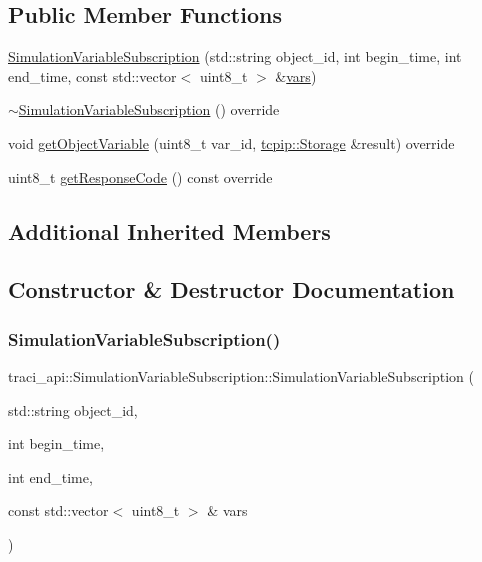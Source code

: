 \subsection*{Public Member Functions}
\begin{DoxyCompactItemize}
\item 
\hyperlink{classtraci__api_1_1_simulation_variable_subscription_a951c6d8797603b6bb73e6e78c226cf07}{Simulation\+Variable\+Subscription} (std\+::string object\+\_\+id, int begin\+\_\+time, int end\+\_\+time, const std\+::vector$<$ uint8\+\_\+t $>$ \&\hyperlink{classtraci__api_1_1_variable_subscription_a59bec6554debe2d14d75c29017561959}{vars})
\item 
\hyperlink{classtraci__api_1_1_simulation_variable_subscription_a25629e076fde526a24425f79da6523da}{$\sim$\+Simulation\+Variable\+Subscription} () override
\item 
void \hyperlink{classtraci__api_1_1_simulation_variable_subscription_aaa64f6368289ff45730d718e3f38f762}{get\+Object\+Variable} (uint8\+\_\+t var\+\_\+id, \hyperlink{classtcpip_1_1_storage}{tcpip\+::\+Storage} \&result) override
\item 
uint8\+\_\+t \hyperlink{classtraci__api_1_1_simulation_variable_subscription_a1f5a6a5d62fe7a054f87311b0c5b6f5f}{get\+Response\+Code} () const override
\end{DoxyCompactItemize}
\subsection*{Additional Inherited Members}


\subsection{Constructor \& Destructor Documentation}
\mbox{\label{classtraci__api_1_1_simulation_variable_subscription_a951c6d8797603b6bb73e6e78c226cf07}} 
\subsubsection{\texorpdfstring{Simulation\+Variable\+Subscription()}{SimulationVariableSubscription()}}
{\footnotesize\ttfamily traci\+\_\+api\+::\+Simulation\+Variable\+Subscription\+::\+Simulation\+Variable\+Subscription (\begin{DoxyParamCaption}\item[{std\+::string}]{object\+\_\+id,  }\item[{int}]{begin\+\_\+time,  }\item[{int}]{end\+\_\+time,  }\item[{const std\+::vector$<$ uint8\+\_\+t $>$ \&}]{vars }\end{DoxyParamCaption})\hspace{0.3cm}{\ttfamily [inline]}}

